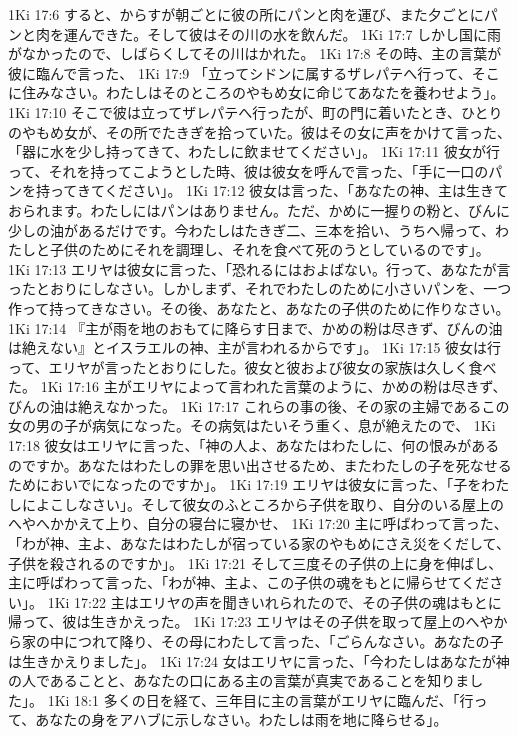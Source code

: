 1Ki 17:6  すると、からすが朝ごとに彼の所にパンと肉を運び、また夕ごとにパンと肉を運んできた。そして彼はその川の水を飲んだ。
1Ki 17:7  しかし国に雨がなかったので、しばらくしてその川はかれた。
1Ki 17:8  その時、主の言葉が彼に臨んで言った、
1Ki 17:9  「立ってシドンに属するザレパテへ行って、そこに住みなさい。わたしはそのところのやもめ女に命じてあなたを養わせよう」。
1Ki 17:10  そこで彼は立ってザレパテへ行ったが、町の門に着いたとき、ひとりのやもめ女が、その所でたきぎを拾っていた。彼はその女に声をかけて言った、「器に水を少し持ってきて、わたしに飲ませてください」。
1Ki 17:11  彼女が行って、それを持ってこようとした時、彼は彼女を呼んで言った、「手に一口のパンを持ってきてください」。
1Ki 17:12  彼女は言った、「あなたの神、主は生きておられます。わたしにはパンはありません。ただ、かめに一握りの粉と、びんに少しの油があるだけです。今わたしはたきぎ二、三本を拾い、うちへ帰って、わたしと子供のためにそれを調理し、それを食べて死のうとしているのです」。
1Ki 17:13  エリヤは彼女に言った、「恐れるにはおよばない。行って、あなたが言ったとおりにしなさい。しかしまず、それでわたしのために小さいパンを、一つ作って持ってきなさい。その後、あなたと、あなたの子供のために作りなさい。
1Ki 17:14  『主が雨を地のおもてに降らす日まで、かめの粉は尽きず、びんの油は絶えない』とイスラエルの神、主が言われるからです」。
1Ki 17:15  彼女は行って、エリヤが言ったとおりにした。彼女と彼および彼女の家族は久しく食べた。
1Ki 17:16  主がエリヤによって言われた言葉のように、かめの粉は尽きず、びんの油は絶えなかった。
1Ki 17:17  これらの事の後、その家の主婦であるこの女の男の子が病気になった。その病気はたいそう重く、息が絶えたので、
1Ki 17:18  彼女はエリヤに言った、「神の人よ、あなたはわたしに、何の恨みがあるのですか。あなたはわたしの罪を思い出させるため、またわたしの子を死なせるためにおいでになったのですか」。
1Ki 17:19  エリヤは彼女に言った、「子をわたしによこしなさい」。そして彼女のふところから子供を取り、自分のいる屋上のへやへかかえて上り、自分の寝台に寝かせ、
1Ki 17:20  主に呼ばわって言った、「わが神、主よ、あなたはわたしが宿っている家のやもめにさえ災をくだして、子供を殺されるのですか」。
1Ki 17:21  そして三度その子供の上に身を伸ばし、主に呼ばわって言った、「わが神、主よ、この子供の魂をもとに帰らせてください」。
1Ki 17:22  主はエリヤの声を聞きいれられたので、その子供の魂はもとに帰って、彼は生きかえった。
1Ki 17:23  エリヤはその子供を取って屋上のへやから家の中につれて降り、その母にわたして言った、「ごらんなさい。あなたの子は生きかえりました」。
1Ki 17:24  女はエリヤに言った、「今わたしはあなたが神の人であることと、あなたの口にある主の言葉が真実であることを知りました」。
1Ki 18:1  多くの日を経て、三年目に主の言葉がエリヤに臨んだ、「行って、あなたの身をアハブに示しなさい。わたしは雨を地に降らせる」。
